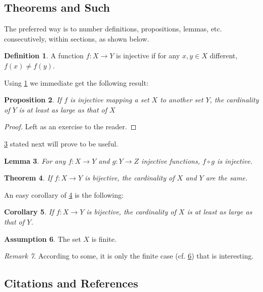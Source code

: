 \documentclass{article}
\theoremstyle{plain}
\newtheorem{theorem}{Theorem}[section]
\newtheorem{proposition}[theorem]{Proposition}
\newtheorem{lemma}[theorem]{Lemma}
\newtheorem{corollary}[theorem]{Corollary}
\theoremstyle{definition}
\newtheorem{definition}[theorem]{Definition}
\newtheorem{assumption}[theorem]{Assumption}
\theoremstyle{remark}
\newtheorem{remark}[theorem]{Remark}
\begin{document}
\subsection{Theorems and Such}
The preferred way is to number definitions, propositions, lemmas, etc.
consecutively, within sections, as shown below.
\begin{definition}
  \label{def:inj}
  A function $f:X \to Y$ is injective if for any $x,y\in X$ different, $f(x)\ne
    f(y)$.
\end{definition}
Using \cref{def:inj} we immediate get the following result:
\begin{proposition}
  If $f$ is injective mapping a set $X$ to another set $Y$,
  the cardinality of $Y$ is at least as large as that of $X$
\end{proposition}
\begin{proof}
  Left as an exercise to the reader.
\end{proof}
\cref{lem:usefullemma} stated next will prove to be useful.
\begin{lemma}
  \label{lem:usefullemma}
  For any $f:X \to Y$ and $g:Y\to Z$ injective functions, $f \circ g$ is
  injective.
\end{lemma}
\begin{theorem}
  \label{thm:bigtheorem}
  If $f:X\to Y$ is bijective, the cardinality of $X$ and $Y$ are the same.
\end{theorem}
An easy corollary of \cref{thm:bigtheorem} is the following:
\begin{corollary}
  If $f:X\to Y$ is bijective,
  the cardinality of $X$ is at least as large as that of $Y$.
\end{corollary}
\begin{assumption}
  The set $X$ is finite.
  \label{ass:xfinite}
\end{assumption}
\begin{remark}
  According to some, it is only the finite case (cf. \cref{ass:xfinite}) that
  is interesting.
\end{remark}

\subsection{Citations and References}


\end{document}
